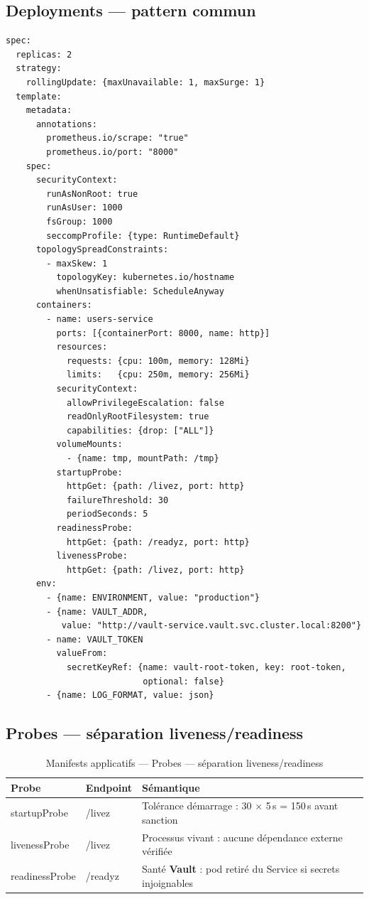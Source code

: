 \documentclass[12pt,a4paper,twoside,openright]{report}
\begin{document}
\subsection{Deployments --- pattern commun}
\begin{lstlisting}[caption={Deployment users-service : extraits significatifs}]
spec:
  replicas: 2
  strategy:
    rollingUpdate: {maxUnavailable: 1, maxSurge: 1}
  template:
    metadata:
      annotations:
        prometheus.io/scrape: "true"
        prometheus.io/port: "8000"
    spec:
      securityContext:
        runAsNonRoot: true
        runAsUser: 1000
        fsGroup: 1000
        seccompProfile: {type: RuntimeDefault}
      topologySpreadConstraints:
        - maxSkew: 1
          topologyKey: kubernetes.io/hostname
          whenUnsatisfiable: ScheduleAnyway
      containers:
        - name: users-service
          ports: [{containerPort: 8000, name: http}]
          resources:
            requests: {cpu: 100m, memory: 128Mi}
            limits:   {cpu: 250m, memory: 256Mi}
          securityContext:
            allowPrivilegeEscalation: false
            readOnlyRootFilesystem: true
            capabilities: {drop: ["ALL"]}
          volumeMounts:
            - {name: tmp, mountPath: /tmp}
          startupProbe:
            httpGet: {path: /livez, port: http}
            failureThreshold: 30
            periodSeconds: 5
          readinessProbe:
            httpGet: {path: /readyz, port: http}
          livenessProbe:
            httpGet: {path: /livez, port: http}
      env:
        - {name: ENVIRONMENT, value: "production"}
        - {name: VAULT_ADDR,
           value: "http://vault-service.vault.svc.cluster.local:8200"}
        - name: VAULT_TOKEN
          valueFrom:
            secretKeyRef: {name: vault-root-token, key: root-token,
                           optional: false}
        - {name: LOG_FORMAT, value: json}
\end{lstlisting}

\subsection{Probes --- séparation liveness/readiness}
\begin{table}[H]
\centering\small
\caption{Manifests applicatifs --- Probes --- séparation liveness/readiness}\label{tab:ch-manifests-applicatifs-probes-separation-liveness}
\begin{tabular}{@{}llp{8.4cm}@{}}
\toprule
\textbf{Probe} & \textbf{Endpoint} & \textbf{Sémantique} \\
\midrule
startupProbe & /livez & Tolérance démarrage : 30 × 5\,s = 150\,s avant sanction \\
livenessProbe & /livez & Processus vivant : aucune dépendance externe vérifiée \\
readinessProbe & /readyz & Santé \textbf{Vault} : pod retiré du Service si secrets injoignables \\
\bottomrule
\end{tabular}
\end{table}
\end{document}
